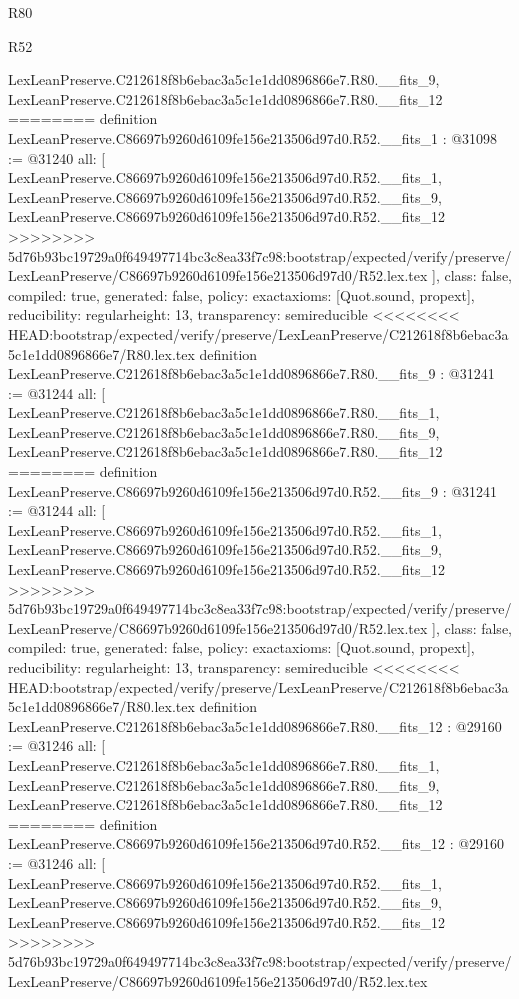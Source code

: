\begin{lexlean}{R80}
\begin{lexlean}{R52}
\begin{coremodule}
{{{{{{{{{{{{{{{{{{{{{{{{{{{{{{{{{{{{{{{{{{{{{{{{{{{{{{{{{{{{{{{{{{{{{{{{{{{{{{{{{{{{{{{{{{{{{{{{{{{{{{{{{{{{{{{{{{{{{{{{{{{{{{{{{{{{{{{{{{{{{{{{{{{{{    LexLeanPreserve.C212618f8b6ebac3a5c1e1dd0896866e7.R80.__fits_9,
    LexLeanPreserve.C212618f8b6ebac3a5c1e1dd0896866e7.R80.__fits_12
========
definition LexLeanPreserve.C86697b9260d6109fe156e213506d97d0.R52.__fits_1 : @31098 := @31240 {
  all: [
    LexLeanPreserve.C86697b9260d6109fe156e213506d97d0.R52.__fits_1,
    LexLeanPreserve.C86697b9260d6109fe156e213506d97d0.R52.__fits_9,
    LexLeanPreserve.C86697b9260d6109fe156e213506d97d0.R52.__fits_12
>>>>>>>> 5d76b93bc19729a0f649497714bc3c8ea33f7c98:bootstrap/expected/verify/preserve/LexLeanPreserve/C86697b9260d6109fe156e213506d97d0/R52.lex.tex
  ],
  class: false,
  compiled: true,
  generated: false,
  policy: exact{axioms: [Quot.sound, propext]},
  reducibility: regular{height: 13},
  transparency: semireducible
}
<<<<<<<< HEAD:bootstrap/expected/verify/preserve/LexLeanPreserve/C212618f8b6ebac3a5c1e1dd0896866e7/R80.lex.tex
definition LexLeanPreserve.C212618f8b6ebac3a5c1e1dd0896866e7.R80.__fits_9 : @31241 := @31244 {
  all: [
    LexLeanPreserve.C212618f8b6ebac3a5c1e1dd0896866e7.R80.__fits_1,
    LexLeanPreserve.C212618f8b6ebac3a5c1e1dd0896866e7.R80.__fits_9,
    LexLeanPreserve.C212618f8b6ebac3a5c1e1dd0896866e7.R80.__fits_12
========
definition LexLeanPreserve.C86697b9260d6109fe156e213506d97d0.R52.__fits_9 : @31241 := @31244 {
  all: [
    LexLeanPreserve.C86697b9260d6109fe156e213506d97d0.R52.__fits_1,
    LexLeanPreserve.C86697b9260d6109fe156e213506d97d0.R52.__fits_9,
    LexLeanPreserve.C86697b9260d6109fe156e213506d97d0.R52.__fits_12
>>>>>>>> 5d76b93bc19729a0f649497714bc3c8ea33f7c98:bootstrap/expected/verify/preserve/LexLeanPreserve/C86697b9260d6109fe156e213506d97d0/R52.lex.tex
  ],
  class: false,
  compiled: true,
  generated: false,
  policy: exact{axioms: [Quot.sound, propext]},
  reducibility: regular{height: 13},
  transparency: semireducible
}
<<<<<<<< HEAD:bootstrap/expected/verify/preserve/LexLeanPreserve/C212618f8b6ebac3a5c1e1dd0896866e7/R80.lex.tex
definition LexLeanPreserve.C212618f8b6ebac3a5c1e1dd0896866e7.R80.__fits_12 : @29160 := @31246 {
  all: [
    LexLeanPreserve.C212618f8b6ebac3a5c1e1dd0896866e7.R80.__fits_1,
    LexLeanPreserve.C212618f8b6ebac3a5c1e1dd0896866e7.R80.__fits_9,
    LexLeanPreserve.C212618f8b6ebac3a5c1e1dd0896866e7.R80.__fits_12
========
definition LexLeanPreserve.C86697b9260d6109fe156e213506d97d0.R52.__fits_12 : @29160 := @31246 {
  all: [
    LexLeanPreserve.C86697b9260d6109fe156e213506d97d0.R52.__fits_1,
    LexLeanPreserve.C86697b9260d6109fe156e213506d97d0.R52.__fits_9,
    LexLeanPreserve.C86697b9260d6109fe156e213506d97d0.R52.__fits_12
>>>>>>>> 5d76b93bc19729a0f649497714bc3c8ea33f7c98:bootstrap/expected/verify/preserve/LexLeanPreserve/C86697b9260d6109fe156e213506d97d0/R52.lex.tex
}}}}}}}}}}}}}}}}}}}}}}}}}}}}}}}}}}}}}}}}}}}}}}}}}}}}}}}}}}}}}}}}}}}}}}}}}}}}}}}}}}}}}}}}}}}}}}}}}}}}}}}}}}}}}}}}}}}}}}}}}}}}}}}}}}}}}}}}}}}}}}}}}}}}}}}}
\end{coremodule}
\end{lexlean}
\end{lexlean}
